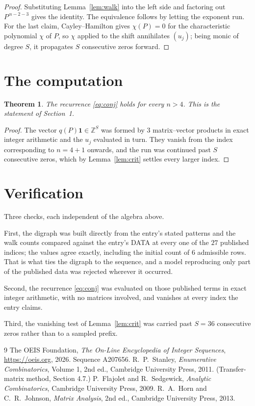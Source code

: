 \documentclass[11pt,a4paper]{article}
\theoremstyle{plain}
\newtheorem{theorem}{Theorem}
\theoremstyle{definition}
\begin{document}
\begin{proof}
Substituting Lemma~\ref{lem:walk} into the left side and factoring out
$P^{\,n-2-3}$ gives the identity. The equivalence follows by letting the exponent
run. For the last claim, Cayley--Hamilton gives $\chi(P)=0$ for the characteristic
polynomial $\chi$ of $P$, so $\chi$ applied to the shift annihilates $(u_j)$; being monic of
degree $S$, it propagates $S$ consecutive zeros forward.
\end{proof}

\section{The computation}

\begin{theorem}
The recurrence \eqref{eq:conj} holds for every $n>4$. This is the statement of
Section~1.
\end{theorem}

\begin{proof}
The vector $q(P)\mathbf{1}\in\mathbb{Z}^{S}$ was formed by $3$ matrix--vector
products in exact integer arithmetic and the $u_j$ evaluated in turn. They vanish from the
index corresponding to $n=4+1$ onwards, and the run was continued past $S$ consecutive
zeros, which by Lemma~\ref{lem:crit} settles every larger index.
\end{proof}

\section{Verification}

Three checks, each independent of the algebra above.

First, the digraph was built directly from the entry's stated patterns and the walk counts
compared against the entry's DATA at every one of the $27$ published indices; the
values agree exactly, including the initial count of $6$ admissible rows. That is
what ties the digraph to the sequence, and a model reproducing only part of the published
data was rejected wherever it occurred.

Second, the recurrence \eqref{eq:conj} was evaluated on those published terms in exact
integer arithmetic, with no matrices involved, and vanishes at every index the entry claims.

Third, the vanishing test of Lemma~\ref{lem:crit} was carried past $S=36$ consecutive
zeros rather than to a sampled prefix.

\begin{thebibliography}{9}
 The OEIS Foundation, \emph{The On-Line Encyclopedia of Integer
Sequences}, \url{https://oeis.org}, 2026. Sequence A207656.
 R.~P.~Stanley, \emph{Enumerative Combinatorics}, Volume 1, 2nd ed.,
Cambridge University Press, 2011. (Transfer-matrix method, Section 4.7.)
 P.~Flajolet and R.~Sedgewick, \emph{Analytic Combinatorics}, Cambridge
University Press, 2009.
 R.~A.~Horn and C.~R.~Johnson, \emph{Matrix Analysis}, 2nd ed., Cambridge
University Press, 2013.
\end{thebibliography}
\end{document}
